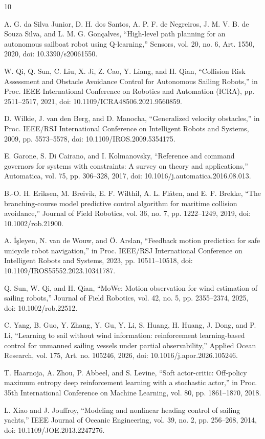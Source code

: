 \documentclass[conference]{IEEEtran}
\begin{document}
\begin{thebibliography}{10}

 A. G. da Silva Junior, D. H. dos Santos, A. P. F. de Negreiros, J. M. V. B. de Souza Silva, and L. M. G. Gon\c{c}alves, ``High-level path planning for an autonomous sailboat robot using Q-learning,'' Sensors, vol. 20, no. 6, Art. 1550, 2020, doi: 10.3390/s20061550.

 W. Qi, Q. Sun, C. Liu, X. Ji, Z. Cao, Y. Liang, and H. Qian, ``Collision Risk Assessment and Obstacle Avoidance Control for Autonomous Sailing Robots,'' in Proc. IEEE International Conference on Robotics and Automation (ICRA), pp. 2511--2517, 2021, doi: 10.1109/ICRA48506.2021.9560859.

 D. Wilkie, J. van den Berg, and D. Manocha, ``Generalized velocity obstacles,'' in Proc. IEEE/RSJ International Conference on Intelligent Robots and Systems, 2009, pp. 5573--5578, doi: 10.1109/IROS.2009.5354175.

 E. Garone, S. Di Cairano, and I. Kolmanovsky, ``Reference and command governors for systems with constraints: A survey on theory and applications,'' Automatica, vol. 75, pp. 306--328, 2017, doi: 10.1016/j.automatica.2016.08.013.

 B.-O. H. Eriksen, M. Breivik, E. F. Wilthil, A. L. Fl\aa{}ten, and E. F. Brekke, ``The branching-course model predictive control algorithm for maritime collision avoidance,'' Journal of Field Robotics, vol. 36, no. 7, pp. 1222--1249, 2019, doi: 10.1002/rob.21900.

 A. \.{I}\c{s}leyen, N. van de Wouw, and \"{O}. Arslan, ``Feedback motion prediction for safe unicycle robot navigation,'' in Proc. IEEE/RSJ International Conference on Intelligent Robots and Systems, 2023, pp. 10511--10518, doi: 10.1109/IROS55552.2023.10341787.

 Q. Sun, W. Qi, and H. Qian, ``MoWe: Motion observation for wind estimation of sailing robots,'' Journal of Field Robotics, vol. 42, no. 5, pp. 2355--2374, 2025, doi: 10.1002/rob.22512.

 C. Yang, B. Guo, Y. Zhang, Y. Gu, Y. Li, S. Huang, H. Huang, J. Dong, and P. Li, ``Learning to sail without wind information: reinforcement learning-based control for unmanned sailing vessels under partial observability,'' Applied Ocean Research, vol. 175, Art. no. 105246, 2026, doi: 10.1016/j.apor.2026.105246.

 T. Haarnoja, A. Zhou, P. Abbeel, and S. Levine, ``Soft actor-critic: Off-policy maximum entropy deep reinforcement learning with a stochastic actor,'' in Proc. 35th International Conference on Machine Learning, vol. 80, pp. 1861--1870, 2018.

 L. Xiao and J. Jouffroy, ``Modeling and nonlinear heading control of sailing yachts,'' IEEE Journal of Oceanic Engineering, vol. 39, no. 2, pp. 256--268, 2014, doi: 10.1109/JOE.2013.2247276.

\end{thebibliography}
\end{document}
